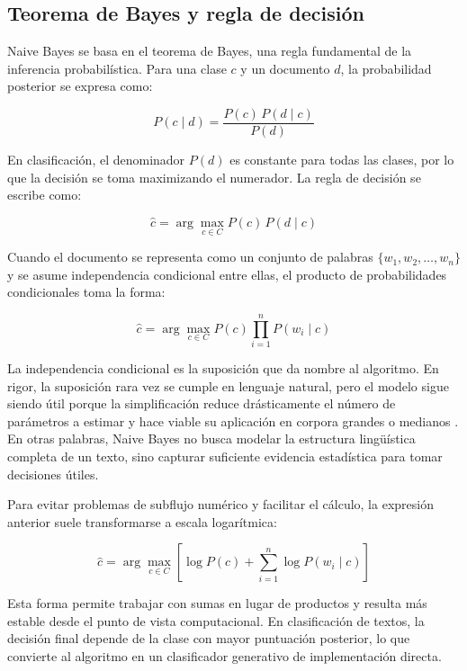 \subsection{Teorema de Bayes y regla de decisión}

Naive Bayes se basa en el teorema de Bayes, una regla fundamental de la inferencia probabilística. Para una clase $c$ y un documento $d$, la probabilidad posterior se expresa como:

\begin{equation}
P(c \mid d) = \frac{P(c)\,P(d \mid c)}{P(d)}
\label{eq:bayes}
\end{equation}

En clasificación, el denominador $P(d)$ es constante para todas las clases, por lo que la decisión se toma maximizando el numerador. La regla de decisión se escribe como:

\begin{equation}
\hat{c} = \arg\max_{c \in C} P(c)\,P(d \mid c)
\label{eq:decision}
\end{equation}

Cuando el documento se representa como un conjunto de palabras $\{w_1, w_2, \dots, w_n\}$ y se asume independencia condicional entre ellas, el producto de probabilidades condicionales toma la forma:

\begin{equation}
\hat{c} = \arg\max_{c \in C} P(c)\prod_{i=1}^{n}P(w_i \mid c)
\label{eq:naive}
\end{equation}

La independencia condicional es la suposición que da nombre al algoritmo. En rigor, la suposición rara vez se cumple en lenguaje natural, pero el modelo sigue siendo útil porque la simplificación reduce drásticamente el número de parámetros a estimar y hace viable su aplicación en corpora grandes o medianos \cite{Kibriya2005,Frank2006}. En otras palabras, Naive Bayes no busca modelar la estructura lingüística completa de un texto, sino capturar suficiente evidencia estadística para tomar decisiones útiles.

Para evitar problemas de subflujo numérico y facilitar el cálculo, la expresión anterior suele transformarse a escala logarítmica:

\begin{equation}
\hat{c} = \arg\max_{c \in C} \left[\log P(c) + \sum_{i=1}^{n}\log P(w_i \mid c)\right]
\label{eq:logdecision}
\end{equation}

Esta forma permite trabajar con sumas en lugar de productos y resulta más estable desde el punto de vista computacional. En clasificación de textos, la decisión final depende de la clase con mayor puntuación posterior, lo que convierte al algoritmo en un clasificador generativo de implementación directa.

